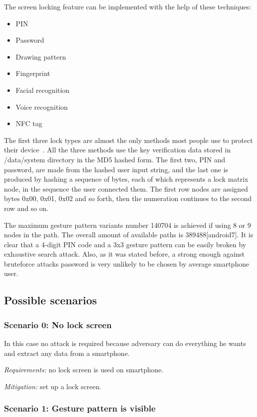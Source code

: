 The screen locking feature can be implemented with the help of these techniques:

\begin{itemize}
\item{}
PIN
\item{}
Password
\item{}
Drawing pattern
\item{}
Fingerprint
\item{}
Facial recognition
\item{}
Voice recognition
\item{}
NFC tag
\end{itemize}

The first three lock types are almost the only methods most people use to protect their device~\cite{android3}. All the three methods use the key verification data stored in /data/system directory in the MD5 hashed form. The first two, PIN and password, are made from the hashed user input string, and the last one is produced by hashing a sequence of bytes, each of which represents a lock matrix node, in the sequence the user connected them. The first row nodes are assigned bytes 0x00, 0x01, 0x02 and so forth, then the numeration continues to the second row and so on.

The maximum gesture pattern variants number 140704 is achieved if using 8 or 9 nodes in the path. The overall amount of available paths is 389488[android7]. It is clear that a 4-digit PIN code and a 3x3 gesture pattern can be easily broken by exhaustive search attack. Also, as it was stated before, a strong enough against bruteforce attacks password is very unlikely to be chosen by average smartphone user.


\subsection{Possible scenarios}

\subsubsection{Scenario 0: No lock screen}
In this case no attack is required because adversary can do everything he wants and extract any data from a smartphone.


\textsl{Requirements:} no lock screen is used on smartphone.

\textsl{Mitigation:} set up a lock screen.

\subsubsection{Scenario 1: Gesture pattern is visible}

